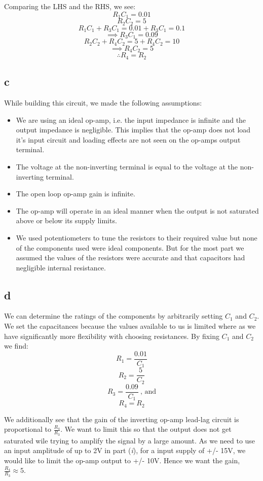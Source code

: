\documentclass{article}
\theoremstyle{plain}
\theoremstyle{definition}
\theoremstyle{remark}
\begin{document}
Comparing the LHS and the RHS, we see:
$$R_1C_1 = 0.01$$
$$R_2C_2 = 5$$
$$R_1C_1 + R_3C_1 = 0.01 + R_3C_1 = 0.1$$
$$\implies R_3C_1 = 0.09$$
$$R_2C_2 + R_4C_2 = 5 + R_4C_2 = 10$$
$$\implies R_4C_2 = 5$$
$$\therefore R_4 = R_2$$

\subsection*{c}
While building this circuit, we made the following assumptions:
\begin{itemize}
\item We are using an ideal op-amp, i.e. the input impedance is infinite and the output impedance is negligible. This implies that the op-amp does not load it's input circuit and loading effects are not seen on the op-amps output terminal.

\item The voltage at the non-inverting terminal is equal to the voltage at the non-inverting terminal.

\item The open loop op-amp gain is infinite.

\item The op-amp will operate in an ideal manner when the output is not saturated above or below its supply limits.

\item We used potentiometers to tune the resistors to their required value but none of the components used were ideal components. But for the most part we assumed the values of the resistors were accurate and that capacitors had negligible internal resistance.

\end{itemize}

\subsection*{d}
We can determine the ratings of the components by arbitrarily setting $C_1$ and $C_2$. We set the capacitances because the values available to us is limited where as we have significantly more flexibility with choosing resistances. By fixing $C_1$ and $C_2$ we find:
$$R_1 = \frac{0.01}{C_1}$$
$$R_2 = \frac{5}{C_2}$$
$$R_3 = \frac{0.09}{C_1} \ \text{,  and}$$
$$R_4 = R_2$$

We additionally see that the gain of the inverting op-amp lead-lag circuit is proportional to $ \frac{R_4}{R_3}$. We  want to limit this so that the output does not get saturated wile trying to amplify the signal by a large amount. As we need to use an input amplitude of up to 2V in part (\emph{i}), for a input supply of +/- 15V, we would like to limit the op-amp output to +/- 10V. Hence we want the gain,$ \frac{R_4}{R_3} \approx 5$. 
\end{document}
